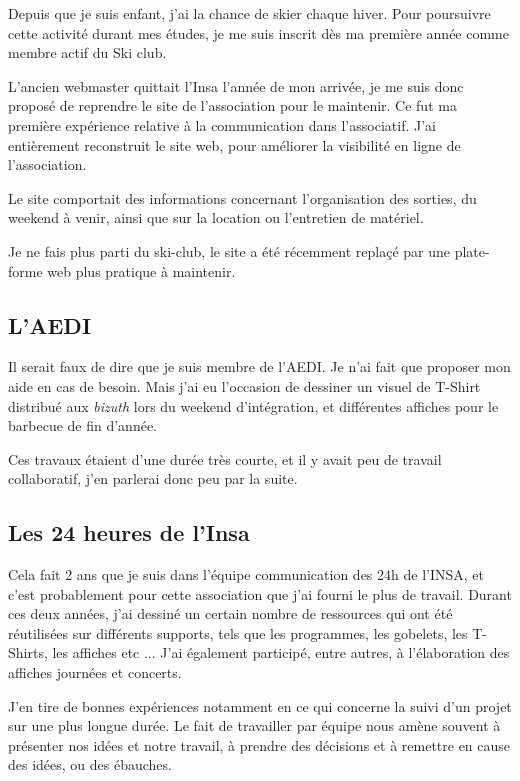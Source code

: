         Depuis que je suis enfant,  j'ai la chance de skier chaque hiver. Pour poursuivre cette activité durant mes études, je me suis inscrit dès ma première année comme membre actif du Ski club.
        
        L'ancien webmaster quittait l'Insa l'année de mon arrivée, je me suis donc proposé de reprendre le site de l'association pour le maintenir.
        Ce fut ma première expérience relative à la communication dans l'associatif.
        J'ai entièrement reconstruit le site web, pour améliorer la visibilité en ligne de l'association.
        
        Le site comportait des informations concernant l'organisation des sorties, du weekend à venir, ainsi que sur la location ou l'entretien de matériel.
        
        Je ne fais plus parti du ski-club, le site a été récemment replaçé par une plate-forme web plus pratique à maintenir. 
        
    \subsection{L'AEDI}
        
        Il serait faux de dire que je suis membre de l'AEDI. Je n'ai fait que proposer mon aide en cas de besoin.
        Mais j'ai eu l'occasion de dessiner un visuel de T-Shirt distribué aux \emph{bizuth} lors du weekend d'intégration, et différentes affiches pour le barbecue de fin d'année.
        
        Ces travaux étaient d'une durée très courte, et il y avait peu de travail collaboratif, j'en parlerai donc peu par la suite.
        
    \subsection{Les 24 heures de l'Insa}
        
        Cela fait 2 ans que je suis dans l'équipe communication des 24h de l'INSA, et c'est probablement pour cette association que j'ai fourni le plus de travail.
        Durant ces deux années,  j'ai dessiné un certain nombre de ressources qui ont été réutilisées sur différents supports, tels que les programmes, les gobelets, les T-Shirts, les affiches etc ...
        J'ai également participé, entre autres, à l'élaboration des affiches journées et concerts.
        
        J'en tire de bonnes expériences notamment en ce qui concerne la suivi d'un projet sur une plus longue durée.
        Le fait de travailler par équipe nous amène souvent à présenter nos idées et notre travail, à prendre des décisions et à remettre en cause des idées, ou des ébauches.
        
